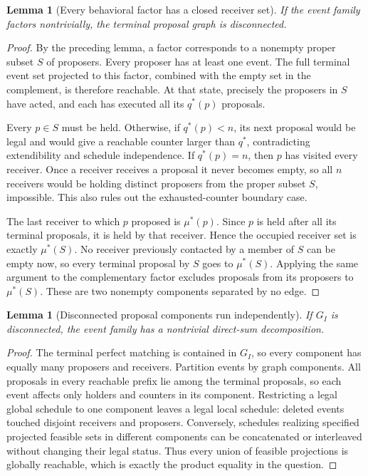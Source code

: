 \documentclass[11pt,a4paper]{article}
\newtheorem{lemma}[theorem]{Lemma}
\begin{document}
\begin{lemma}[Every behavioral factor has a closed receiver set]
If the event family factors nontrivially, the terminal proposal graph is disconnected.
\end{lemma}
\begin{proof}
By the preceding lemma, a factor corresponds to a nonempty proper subset $S$ of proposers. Every proposer has at least one event. The full terminal event set projected to this factor, combined with the empty set in the complement, is therefore reachable. At that state, precisely the proposers in $S$ have acted, and each has executed all its $q^*(p)$ proposals.

Every $p\in S$ must be held. Otherwise, if $q^*(p)<n$, its next proposal would be legal and would give a reachable counter larger than $q^*$, contradicting extendibility and schedule independence. If $q^*(p)=n$, then $p$ has visited every receiver. Once a receiver receives a proposal it never becomes empty, so all $n$ receivers would be holding distinct proposers from the proper subset $S$, impossible. This also rules out the exhausted-counter boundary case.

The last receiver to which $p$ proposed is $\mu^*(p)$. Since $p$ is held after all its terminal proposals, it is held by that receiver. Hence the occupied receiver set is exactly $\mu^*(S)$. No receiver previously contacted by a member of $S$ can be empty now, so every terminal proposal by $S$ goes to $\mu^*(S)$. Applying the same argument to the complementary factor excludes proposals from its proposers to $\mu^*(S)$. These are two nonempty components separated by no edge.
\end{proof}

\begin{lemma}[Disconnected proposal components run independently]
If $G_I$ is disconnected, the event family has a nontrivial direct-sum decomposition.
\end{lemma}
\begin{proof}
The terminal perfect matching is contained in $G_I$, so every component has equally many proposers and receivers. Partition events by graph components. All proposals in every reachable prefix lie among the terminal proposals, so each event affects only holders and counters in its component. Restricting a legal global schedule to one component leaves a legal local schedule: deleted events touched disjoint receivers and proposers. Conversely, schedules realizing specified projected feasible sets in different components can be concatenated or interleaved without changing their legal status. Thus every union of feasible projections is globally reachable, which is exactly the product equality in the question.
\end{proof}
\end{document}
